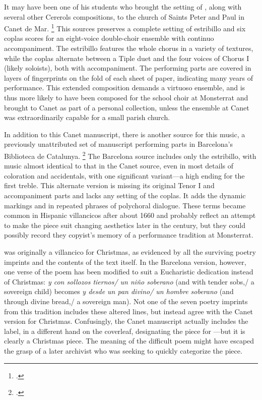 It may have been one of his students who brought the setting of
, along with several other Cererols compositions, to
the church of Saints Peter and Paul in Canet de Mar.%
    \footnote{.}
This sources preserves a complete setting of estribillo and six coplas scores
for an eight-voice double-choir ensemble with continuo accompaniment.
The estribillo features the whole chorus in a variety of textures, while the
coplas alternate between a Tiple duet and the four voices of Chorus I (likely
soloists), both with accompaniment.
The performing parts are covered in layers of fingerprints on the fold of each
sheet of paper, indicating many years of performance.
This extended composition demands a virtuoso ensemble, and is thus more likely
to have been composed for the school choir at Monsterrat and brought to Canet as
part of a personal collection, unless the ensemble at Canet was extraordinarily
capable for a small parish church.

In addition to this Canet manuscript, there is another source for this music, a
previously unattributed set of manuscript performing parts in Barcelona's
Biblioteca de Catalunya.%
    \footnote{.}
The Barcelona source includes only the estribillo, with music almost identical
to that in the Canet source, even in most details of coloration and accidentals,
with one significant variant---a  high ending for the first treble.
This alternate version is missing its original Tenor I and accompaniment parts
and lacks any setting of the coplas.
It adds the dynamic markings  and  in repeated phrases
of polychoral dialogue. 
These terms became common in Hispanic villancicos after about 1660 and probably
reflect an attempt to make the piece suit changing aesthetics later in the
century, but they could possibly record they copyist's memory of a performance
tradition at Monsterrat.

 was originally a villancico for Christmas, as
evidenced by all the surviving poetry imprints and the contents of the text
itself.
In the Barcelona version, however, one verse of the poem has been modified to
suit a Eucharistic dedication instead of Christmas: \emph{y con sollozos
tiernos/ un niño soberano} (and with tender sobs,/ a sovereign child) becomes
\emph{y desde un pan divino/ un hombre soberano} (and through divine bread,/ a
sovereign man).
Not one of the seven poetry imprints from this tradition includes these altered
lines, but instead agree with the Canet version for Christmas.
Confusingly, the Canet manuscript actually includes the label, in a different
hand on the coverleaf, designating the piece for ---but it is clearly a Christmas piece.
The meaning of the difficult poem might have escaped the grasp of a later
archivist who was seeking to quickly categorize the piece.


